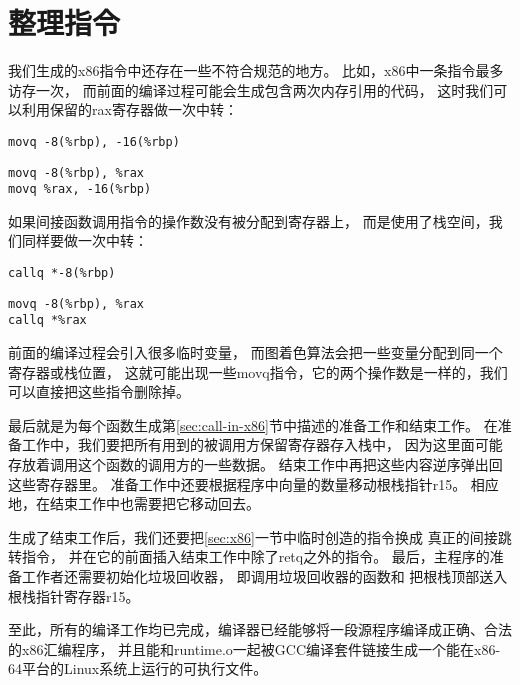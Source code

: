 
\section{整理指令}

我们生成的x86指令中还存在一些不符合规范的地方。
比如，x86中一条指令最多访存一次，
而前面的编译过程可能会生成包含两次内存引用的代码，
这时我们可以利用保留的rax寄存器做一次中转：

\begin{transformation}
\begin{lstlisting}
movq -8(%rbp), -16(%rbp)
\end{lstlisting}
\compilesto
\begin{lstlisting}
movq -8(%rbp), %rax
movq %rax, -16(%rbp)
\end{lstlisting}
\end{transformation}

如果间接函数调用指令的操作数没有被分配到寄存器上，
而是使用了栈空间，我们同样要做一次中转：
\begin{transformation}
\begin{lstlisting}
callq *-8(%rbp)
\end{lstlisting}
\compilesto
\begin{lstlisting}
movq -8(%rbp), %rax
callq *%rax
\end{lstlisting}
\end{transformation}

前面的编译过程会引入很多临时变量，
而图着色算法会把一些变量分配到同一个寄存器或栈位置，
这就可能出现一些movq指令，它的两个操作数是一样的，我们可以直接把这些指令删除掉。

最后就是为每个函数生成第\ref{sec:call-in-x86}节中描述的准备工作和结束工作。
在准备工作中，我们要把所有用到的被调用方保留寄存器存入栈中，
因为这里面可能存放着调用这个函数的调用方的一些数据。
结束工作中再把这些内容逆序弹出回这些寄存器里。
准备工作中还要根据程序中向量的数量移动根栈指针r15。
相应地，在结束工作中也需要把它移动回去。

生成了结束工作后，我们还要把\ref{sec:x86}一节中临时创造的指令换成
真正的间接跳转指令，
并在它的前面插入结束工作中除了retq之外的指令。
最后，主程序的准备工作者还需要初始化垃圾回收器，
即调用垃圾回收器的函数和
把根栈顶部送入根栈指针寄存器r15。

至此，所有的编译工作均已完成，编译器已经能够将一段源程序编译成正确、合法的x86汇编程序，
并且能和runtime.o一起被GCC编译套件链接生成一个能在x86-64平台的Linux系统上运行的可执行文件。
